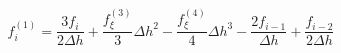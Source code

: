 \begin{equation} 
f^{{(1)}}_{i} = \frac{3 f_{i}}{2 {\Delta h}} + \frac{f^{{(3)}}_{{\xi}}}{3} {\Delta h}^{2} - \frac{f^{{(4)}}_{{\xi}}}{4} {\Delta h}^{3} - \frac{2 f_{{i-1}}}{{\Delta h}} + \frac{f_{{i-2}}}{2 {\Delta h}}
 \end{equation} 
